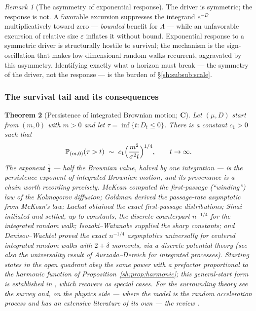 \documentclass[11pt]{article}
\numberwithin{equation}{section}
\theoremstyle{plain}
\newtheorem{theorem}{Theorem}[section]
\theoremstyle{definition}
\theoremstyle{remark}
\newtheorem{remark}[theorem]{Remark}
\newcommand{\PP}{\mathbb{P}}
\begin{document}
\begin{remark}[The asymmetry of exponential response]\label{sh:rem:asym}
The driver is symmetric; the response is not. A favorable excursion
suppresses the integrand $e^{-D}$ multiplicatively toward zero ---
\emph{bounded} benefit for $\Lambda$ --- while an unfavorable excursion of
relative size $\varepsilon$ inflates it without bound. Exponential response
to a symmetric driver is structurally hostile to survival; the mechanism is
the sign-oscillation that makes low-dimensional random walks recurrent,
aggravated by this asymmetry. Identifying exactly what a horizon must break
--- the symmetry of the driver, not the response --- is the burden of
\S\ref{sh:subsub:scale}.
\end{remark}

\subsubsection{The survival tail and its consequences}\label{sh:subsub:tail}

\begin{theorem}[Persistence of integrated Brownian motion; \textbf{C}]
\label{sh:thm:persist}
Let $(\mu,D)$ start from $(m,0)$ with $m>0$ and let
$\tau=\inf\{t:D_t\le0\}$. There is a constant $c_1>0$ such that
\begin{equation}\label{sh:eq:persist}
\PP_{(m,0)}(\tau>t)\ \sim\ c_1\Bigl(\frac{m^2}{\sigma^2t}\Bigr)^{1/4},
\qquad t\to\infty .
\end{equation}
The exponent $\tfrac14$ --- half the Brownian value, halved by one
integration --- is the persistence exponent of integrated Brownian
motion, and its provenance is a chain worth recording precisely. McKean
\cite{McK63} computed the first-passage (``winding'') law of the
Kolmogorov diffusion; Goldman \cite{Gol71} derived the passage-rate
asymptotic from McKean's law; Lachal \cite{Lac91} obtained the exact
first-passage distributions; Sinai \cite{Sin92} initiated and settled,
up to constants, the discrete counterpart $n^{-1/4}$ for the integrated
random walk; Isozaki--Watanabe \cite{IW94} supplied the sharp constants;
and Denisov--Wachtel \cite{DW15} proved the exact $n^{-1/4}$ asymptotics
universally for centered integrated random walks with $2+\delta$
moments, via a discrete potential theory (see also the universality
result of Aurzada--Dereich \cite{AD13} for integrated processes).
Starting states in the open quadrant obey the same power with a
prefactor proportional to the harmonic function of
Proposition~\ref{sh:prop:harmonic}; this general-start form is
established in \cite{GJW99}, which recovers \cite{Gol71,IW94} as
special cases. For the surrounding theory see the survey \cite{AS15}
and, on the physics side --- where the model is the \emph{random
acceleration process} and has an extensive literature of its own ---
the review \cite{BMS13}.
\end{theorem}
\end{document}
